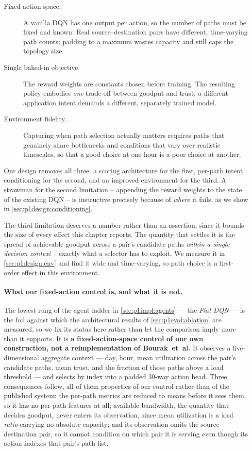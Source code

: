 \begin{description}
  \item[Fixed action space.] A vanilla DQN has one output per action, so the number of paths must be
  fixed and known. Real source--destination pairs have different, time-varying path counts; padding to
  a maximum wastes capacity and still caps the topology size.
  \item[Single baked-in objective.] The reward weights are constants chosen before training. The
  resulting policy embodies \emph{one} trade-off between goodput and trust; a different application
  intent demands a different, separately trained model.
  \item[Environment fidelity.] Capturing when path selection actually matters requires paths that
  genuinely share bottlenecks and conditions that vary over realistic timescales, so that a good choice
  at one hour is a poor choice at another.
\end{description}

Our design removes all three: a scoring architecture for the first, per-path intent conditioning for the
second, and an improved environment for the third. A strawman for the second limitation -- appending the
reward weights to the state of the existing DQN -- is instructive precisely because of \emph{where} it
fails, as we show in \cref{sec:p1design:conditioning}.

The third limitation deserves a number rather than an assertion, since it bounds the size of every effect
this chapter reports. The quantity that settles it is the spread of achievable goodput across a pair's
candidate paths \emph{within a single decision context} -- exactly what a selector has to exploit. We
measure it in \cref{sec:p1design:env} and find it wide and time-varying, so path choice is a first-order
effect in this environment.

\paragraph{What our fixed-action control is, and what it is not.} The lowest rung of the agent ladder in
\cref{sec:p1impl:agents} --- the \emph{Flat DQN} --- is the foil against which the architectural results
of \cref{sec:p1eval:ablation} are measured, so we fix its status here rather than let the comparison
imply more than it supports. It is \textbf{a fixed-action-space control of our own construction, not a
reimplementation of Bourak~et~al.} It observes a five-dimensional aggregate context --- day, hour, mean
utilization across the pair's candidate paths, mean trust, and the fraction of those paths above a load
threshold --- and selects by index into a padded 30-way action head. Three consequences follow, all of
them properties of our control rather than of the published system: the per-path metrics are reduced to
means before it sees them, so it has no per-path features at all; available bandwidth, the quantity that
decides goodput, never enters its observation, since mean utilization is a load \emph{ratio} carrying no
absolute capacity; and its observation omits the source--destination pair, so it cannot condition on
which pair it is serving even though its action indexes that pair's path list.

